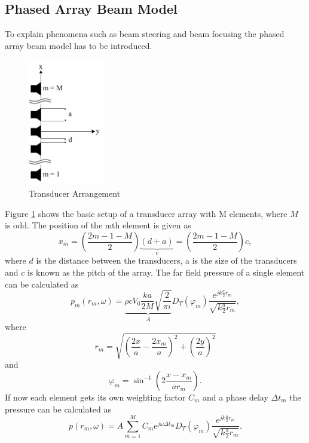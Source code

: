 \subsection{Phased Array Beam Model}\label{3_subsec:phased_array_model}
To explain phenomena such as beam steering and beam focusing the phased array beam model has to be introduced.
 \begin{figure}[h!]
     \centering
     \includegraphics[width=0.3\textwidth]{images/3_Parametric_array/Transducer_Arangement.pdf}
     \caption{Transducer Arrangement}
     \label{3_Parametric_array_img:Transducer_Model}
 \end{figure}
Figure \ref{3_Parametric_array_img:Transducer_Model} shows the basic setup of a transducer array with M elements, where $M$ is odd. The position of the mth element is given as \cite{alma99116706330905515} 
\begin{equation}\label{3.4_eq:simplified_xm}
    x_m 
    = 
    \left ( \frac{2m -1 - M}{2} \right ) \underbrace{(d + a)}_{c}
    =
    \left ( \frac{2m -1 - M}{2} \right ) c,
\end{equation}
where $d$ is the distance between the transducers, a is the size of the transducers and $c$ is known as the pitch of the array. 
The far field pressure of a single element can be calculated as \cite{alma99116706330905515}
\begin{equation}
    p_m(r_m,\omega) 
    =
    \underbrace{\rho c V_0 \frac{k a}{2 M} \sqrt{\frac{2}{\pi i}}}_{A} D_T(\varphi_{m}) \frac{e^{j k \frac{a}{2} r_m}}{\sqrt{k \frac{a}{2} r_m}}, 
\end{equation}
where
\begin{equation}
    r_m
    = 
    \sqrt{\left ( \frac{2x}{a} - \frac{2x_m}{a}\right )^2 + \left ( \frac{2y}{a} \right )^2}
\end{equation}
and 
\begin{equation}
    \varphi_m = \sin^{-1}{\left ( 2\frac{x - x_m}{a r_m} \right )}.
\end{equation}
If now each element gets its own weighting factor $C_m$ and a phase delay $\Delta t_m$ the pressure can be calculated as 
\begin{equation}
    p(r_m,\omega) 
    = 
    A \sum_{m=1}^M C_m e^{j\omega \Delta t_m}  D_T(\varphi_{m}) \frac{e^{j k \frac{a}{2} r_m}}{\sqrt{k \frac{a}{2} r_m}}.
\end{equation}
